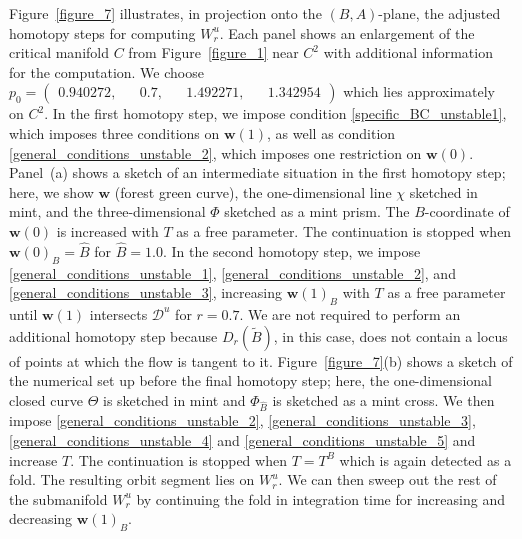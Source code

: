 \documentclass{ws-ijbc}
\begin{document}
Figure~\ref{figure_7} illustrates, in projection onto the $(B,A)$-plane, the adjusted homotopy steps for computing $W^u_r$.  Each panel shows an enlargement of the critical manifold $C$ from Figure~\ref{figure_1} near $C^2$ with additional information for the computation.   We choose $p_0=\begin{pmatrix} 0.940272, && 0.7, && 1.492271, && 1.342954 \end{pmatrix}$ which lies approximately on $C^2$.  In the first homotopy step, we impose condition \eqref{specific_BC_unstable1}, which imposes three conditions on $\mathbf{w}(1)$, as well as condition \eqref{general_conditions_unstable_2}, which imposes one restriction on $\mathbf{w}(0)$.  Panel~(a) shows a sketch of an intermediate situation in the first homotopy step; here, we show $\mathbf{w}$ (forest green curve), the one-dimensional line $\chi$ sketched in mint, and the three-dimensional $\Phi$ sketched as a mint prism.  The $B$-coordinate of $\mathbf{w}(0)$ is increased with $T$ as a free parameter.  The continuation is stopped when $\mathbf{w}(0)_B=\widehat{B}$ for $\widehat{B}=1.0$.  In the second homotopy step, we impose \eqref{general_conditions_unstable_1}, \eqref{general_conditions_unstable_2}, and \eqref{general_conditions_unstable_3}, increasing $\mathbf{w}(1)_B$ with $T$ as a free parameter until $\mathbf{w}(1)$ intersects $\mathscr{D}^u$ for $r=0.7$.  We are not required to perform an additional homotopy step because $D_r(\widetilde{B})$, in this case, does not contain a locus of points at which the flow is tangent to it.  Figure~\ref{figure_7}(b) shows a sketch of the numerical set up before the final homotopy step; here, the one-dimensional closed curve $\Theta$ is sketched in mint and $\Phi_{\widehat{B}}$ is sketched as a mint cross. We then impose \eqref{general_conditions_unstable_2}, \eqref{general_conditions_unstable_3}, \eqref{general_conditions_unstable_4} and \eqref{general_conditions_unstable_5} and increase $T$.  The continuation is stopped when $T=T^B$ which is again detected as a fold.  The resulting orbit segment lies on $W^u_r$.  We can then sweep out the rest of the submanifold $W^u_r$ by continuing the fold in integration time for increasing and decreasing $\mathbf{w}(1)_B$.
\end{document}
